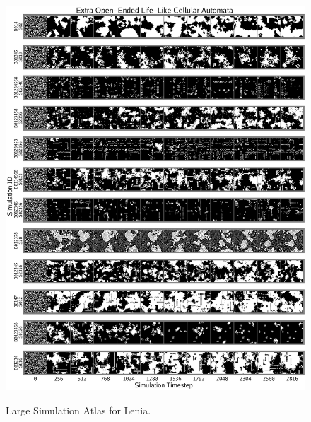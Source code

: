 \documentclass{article}
\begin{document}
\begin{figure}[ht]
  \centering
  \includegraphics[width=1.0\linewidth]{figs/oe_gol_extra_compressed.pdf}
  \caption{
  }
  \label{fig:oe_gol_extra}
\end{figure}


\begin{figure}[ht]
    \centering
    \caption{Large Simulation Atlas for Lenia.}
    \label{fig:atlas_lenia_large}
\end{figure}
\end{document}

